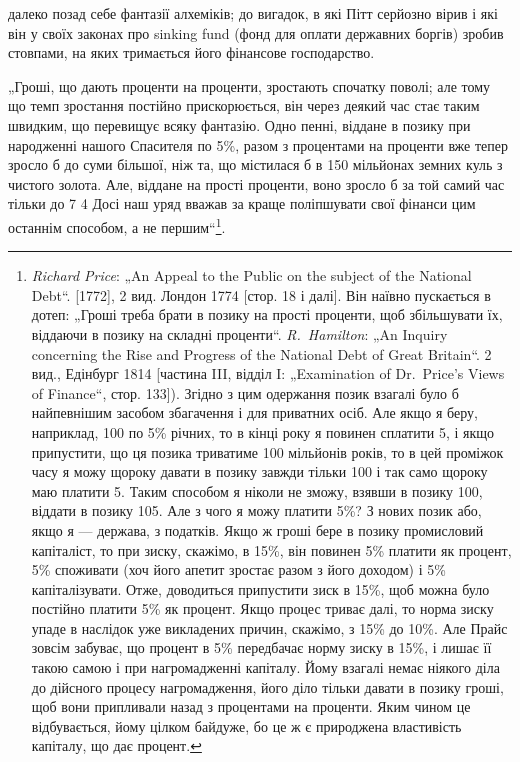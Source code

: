 \parcont{}  %
далеко позад себе фантазії алхеміків; до вигадок, в які Пітт
серйозно вірив і які він у своїх законах про sinking fund (фонд
для оплати державних боргів) зробив стовпами, на яких тримається
його фінансове господарство.

\disablefootnotebreak{}
„Гроші, що дають проценти на проценти, зростають спочатку
поволі; але тому що темп зростання постійно прискорюється, він
через деякий час стає таким швидким, що перевищує всяку фантазію.
Одно пенні, віддане в позику при народженні нашого
Спасителя по 5\%, разом з процентами на проценти вже тепер
зросло б до суми більшої, ніж та, що містилася б в 150 мільйонах
земних куль з чистого золота. Але, віддане на прості проценти,
воно зросло б за той самий час тільки до 7 4
Досі наш уряд вважав за краще поліпшувати свої фінанси цим
останнім способом, а не першим“\footnote{
\emph{Richard Price}: „An Appeal to the Public on the subject of the National Debt“.
[1772], 2 вид. Лондон 1774 [стор. 18 і далі]. Він наївно пускається в дотеп: „Гроші
треба брати в позику на прості проценти, щоб збільшувати їх, віддаючи в позику
на складні проценти“. \emph{R.~Hamilton}: „An Inquiry concerning the Rise and
Progress of the National Debt of Great Britain“. 2 вид., Едінбург 1814 [частина III,
відділ I: „Examination of Dr.~Price’s Views of Finance“, стор. 133]). Згідно з цим
одержання позик взагалі було б найпевнішим засобом збагачення і для приватних
осіб. Але якщо я беру, наприклад, 100 по 5\% річних,
то в кінці року я повинен сплатити 5, і якщо припустити, що
ця позика триватиме 100 мільйонів років, то в цей проміжок часу я можу щороку
давати в позику завжди тільки 100 і так само щороку маю платити
5. Таким способом я ніколи не зможу, взявши в позику
100, віддати в позику 105. Але з чого я можу
платити 5\%? З нових позик або, якщо я — держава, з податків. Якщо ж гроші
бере в позику промисловий капіталіст, то при зиску, скажімо, в 15\%, він повинен
5\% платити як процент, 5\% споживати (хоч його апетит зростає разом
з його доходом) і 5\% капіталізувати. Отже, доводиться припустити зиск в 15\%,
щоб можна було постійно платити 5\% як процент. Якщо процес триває далі, то
норма зиску упаде в наслідок уже викладених причин, скажімо, з 15\% до 10\%.
Але Прайс зовсім забуває, що процент в 5\% передбачає норму зиску в 15\%,
і лишає її такою самою і при нагромадженні капіталу. Йому взагалі немає ніякого
діла до дійсного процесу нагромадження, його діло тільки давати в позику
гроші, щоб вони припливали назад з процентами на проценти. Яким чином
це відбувається, йому цілком байдуже, бо це ж є природжена властивість
капіталу, що дає процент.
}.
\enablefootnotebreak{}


